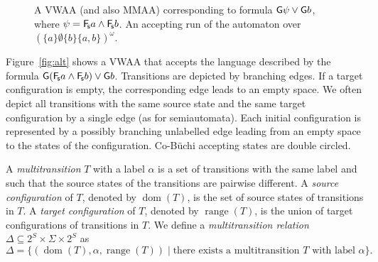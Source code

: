 \documentclass{llncs}
\DeclareMathOperator*{\range}{{range}}
\DeclareMathOperator*{\dom}{{dom}}
\begin{document}
\begin{figure}[!t]
{
  }
  \caption{ A VWAA (and also
    MMAA) corresponding to formula $\mathsf{G}\psi\lor\mathsf{G} b$, where $\psi={\mathsf{F}\!_\mathsf{s}} a\land{\mathsf{F}\!_\mathsf{s}}
    b$.  An accepting run of the automaton
over $(\{a\}\emptyset\{b\}\{a,b\})^\omega$.}
\end{figure}



Figure~\ref{fig:alt} shows a VWAA that accepts the
language described by the formula $\mathsf{G}({\mathsf{F}\!_\mathsf{s}} a \land {\mathsf{F}\!_\mathsf{s}} b) \lor \mathsf{G} b$.
Transitions are depicted by branching edges.  If a target configuration
is empty, the corresponding edge leads to an empty space.  We often depict all
transitions with the same source state and the same target configuration by
a single edge (as for semiautomata).  Each initial configuration is
represented by a possibly branching unlabelled edge leading from an empty
space to the states of the configuration.  Co-B\"{u}chi accepting states are
double circled.



A \emph{multitransition} $T$ with a label $\alpha$ is a set of transitions
with the same label and such that the source states of the transitions are
pairwise different.  A \emph{source configuration} of $T$, denoted by
$\dom(T)$, is the set of source states of transitions in $T$.  A
\emph{target configuration} of $T$, denoted by $\range(T)$, is the union of
target configurations of transitions in $T$.  We define a
\emph{multitransition relation} $\Delta \subseteq 2^S \times \Sigma \times
2^S$ as $$\Delta=\{(\dom(T), \alpha, \range(T)) \mid \text{there exists a
  multitransition } T \text{ with label }\alpha\}.$$
\end{document}
